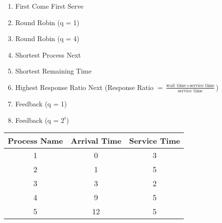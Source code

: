 \documentclass{article}
\begin{document}
\begin{enumerate}
\item First Come First Serve
\item Round Robin (q = 1)
\item Round Robin (q = 4)
\item Shortest Process Next
\item Shortest Remaining Time
\item Highest Response Ratio Next (Response Ratio $= \frac{\text{wait time} + \text{service time}}{\text{service time}}$)
\item Feedback (q = 1)
\item Feedback (q = $2^{i}$)
\end{enumerate}
\begin{center}
\begin{tabular}{|c|c|c|}
\hline
Process Name & Arrival Time & Service Time\\
\hline
1 & 0 & 3\\
\hline
2 & 1 & 5\\
\hline
3 & 3 & 2\\
\hline
4 & 9 & 5\\
\hline
5 & 12 & 5\\
\hline
\end{tabular}

\vspace{0.5cm}


\end{center}
\end{document}
